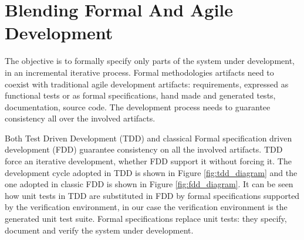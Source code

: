 \documentclass{article}
\begin{document}
\section{Blending Formal And Agile Development}
\label{sec:blending_formal_and_agile_development}

The objective is to formally specify only parts of the system under development, in an incremental iterative process.
Formal methodologies artifacts need to coexist with traditional agile development artifacts: requirements, expressed as functional tests or as formal specifications, hand made and generated tests, documentation, source code.
The development process needs to guarantee consistency all over the involved artifacts.

Both Test Driven Development (TDD) and classical Formal specification driven development (FDD) guarantee consistency on all the involved artifacts. 
TDD force an iterative development, whether FDD support it without forcing it.
The development cycle adopted in TDD is shown in Figure \ref{fig:tdd_diagram} and the one adopted in classic FDD is shown in Figure \ref{fig:fdd_diagram}.
It can be seen how unit tests in TDD are substituted in FDD by formal specifications supported by the verification environment, in our case the verification environment is the generated unit test suite.
Formal specifications replace unit tests: they specify, document and verify the system under development.
\end{document}
